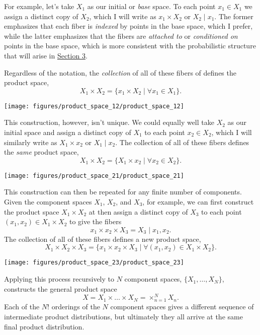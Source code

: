 \documentclass[]{article}
\begin{document}
For example, let's take \(X_{1}\) as our initial or \emph{base} space.
To each point \(x_{1} \in X_{1}\) we assign a distinct copy of
\(X_{2}\), which I will write as \(x_{1} \times X_{2}\) or
\(X_{2} \mid x_{1}\). The former emphasizes that each fiber is
\emph{indexed} by points in the base space, which I prefer, while the
latter emphasizes that the fibers are \emph{attached to} or
\emph{conditioned on} points in the base space, which is more consistent
with the probabilistic structure that will arise in
\protect\hyperlink{sec:chain_rule}{Section 3}.

Regardless of the notation, the \emph{collection} of all of these fibers
of defines the product space, \[
X_{1} \times X_{2} =
\{ x_{1} \times X_{2} \mid \forall x_{1} \in X_{1} \}.
\]

\texttt{[image: figures/product\_space\_12/product\_space\_12]}

This construction, however, isn't unique. We could equally well take
\(X_{2}\) as our initial space and assign a distinct copy of \(X_{1}\)
to each point \(x_{2} \in X_{2}\), which I will similarly write as
\(X_{1} \times x_{2}\) or \(X_{1} \mid x_{2}\). The collection of all of
these fibers defines the \emph{same} product space, \[
X_{1} \times X_{2} =
\{ X_{1} \times x_{2} \mid \forall x_{2} \in X_{2} \}.
\]

\texttt{[image: figures/product\_space\_21/product\_space\_21]}

This construction can then be repeated for any finite number of
components. Given the component spaces \(X_{1}\), \(X_{2}\), and
\(X_{3}\), for example, we can first construct the product space
\(X_{1} \times X_{2}\) at then assign a distinct copy of \(X_{3}\) to
each point \((x_{1}, x_{2}) \in X_{1} \times X_{2}\) to give the fibers
\[
x_{1} \times x_{2} \times X_{3} = X_{3} \mid x_{1}, x_{2}.
\] The collection of all of these fibers defines a new product space, \[
X_{1} \times X_{2} \times X_{3} =
\{ x_{1} \times x_{2} \times X_{3} \mid \forall (x_{1}, x_{2}) \in X_{1} \times X_{2} \}.
\]

\texttt{[image: figures/product\_space\_23/product\_space\_23]}

Applying this process recursively to \(N\) component spaces,
\(\{ X_{1}, \ldots, X_{N} \}\), constructs the general product space \[
X = X_{1} \times \ldots \times X_{N} = \times_{n = 1}^{N} X_{n}.
\] Each of the \(N!\) orderings of the \(N\) component spaces gives a
different sequence of intermediate product distributions, but ultimately
they all arrive at the same final product distribution.
\end{document}
